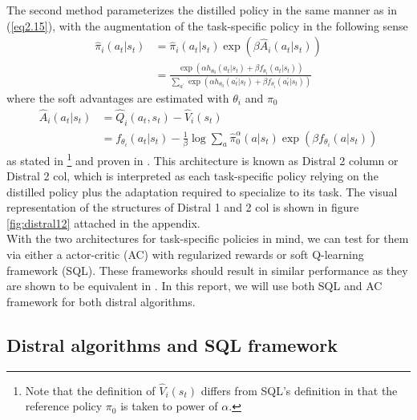 \documentclass[12pt]{report}
\begin{document}
The second method parameterizes the distilled policy in the same manner as in (\ref{eq2.15}), with the augmentation of the task-specific policy in the following sense
\begin{align}
    \hat{\pi}_i(a_t|s_t) &= \hat{\pi}_i(a_t|s_t) \exp{(\beta\hat{A}_i(a_t|s_t))}\\
    &= \frac{\exp{(\alpha h_{\theta_0}(a_t|s_t) + \beta f_{\theta_i}(a_t|s_t))}}{\sum_{a^\prime}\exp{\left(\alpha h_{\theta_0}(a^\prime_t|s_t) + \beta f_{\theta_i}(a^\prime_t|s_t)\right)}} \label{eq:logit2}
\end{align}
where the soft advantages are estimated with $\theta_i$ and $\pi_0$
\begin{align}
    \hat{A}_i(a_t|s_t) &= \hat{Q}_i(a_t,s_t) - \hat{V}_i(s_t) \nonumber\\
    &= f_{\theta_i}(a_t|s_t) - \frac{1}{\beta}\log \sum_a \hat{\pi}_0^\alpha(a|s_t)\exp{(\beta f_{\theta_i}(a|s_t))} \label{eq:distral-SQL-V}
\end{align}
as stated in \cite{teh2017distral}\footnote{Note that the definition of $\hat{V}_i(s_t)$ differs from SQL's definition in that the reference policy $\pi_0$ is taken to power of $\alpha$.} and proven in \cite{rawlik2013stochastic} \cite{fox2015taming} \cite{nachum2017bridging}. This architecture is known as Distral 2 column or Distral 2 col, which is interpreted as each task-specific policy relying on the distilled policy plus the adaptation required to specialize to its task. The visual representation of the structures of Distral 1 and 2 col is shown in figure \ref{fig:distral12} attached in the appendix.\\

With the two architectures for task-specific policies in mind, we can test for them via either a actor-critic (AC) with regularized rewards or soft Q-learning framework (SQL). These frameworks should result in similar performance as they are shown to be equivalent in \cite{schulman2017equivalence}. In this report, we will use both SQL and AC framework for both distral algorithms.

\subsection{Distral algorithms and SQL framework}

\end{document}

